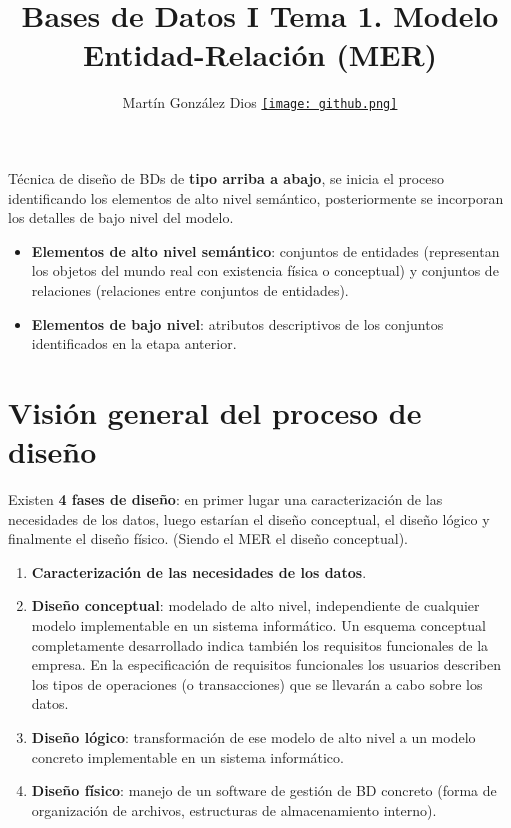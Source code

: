 \documentclass{article}
\title{Bases de Datos I Tema 1. Modelo Entidad-Relación (MER)}
\author{Martín González Dios 
\href{https://github.com/martindios}{\texttt{[image: github.png]}}}
\begin{document}
\maketitle

Técnica de diseño de BDs de \textbf{tipo arriba a abajo}, se inicia el proceso identificando los elementos de alto nivel semántico, posteriormente se incorporan los detalles de bajo nivel del modelo. \\
\begin{itemize}
    \item \textbf{Elementos de alto nivel semántico}: conjuntos de entidades (representan los objetos del mundo real con existencia física o conceptual) y conjuntos de relaciones (relaciones entre conjuntos de entidades).

    \item \textbf{Elementos de bajo nivel}: atributos descriptivos de los conjuntos identificados en la etapa anterior.
\end{itemize}

\section{Visión general del proceso de diseño}
Existen \textbf{4 fases de diseño}: en primer lugar una caracterización de las necesidades de los datos, luego estarían el diseño conceptual, el diseño lógico y finalmente el diseño físico. (Siendo el MER el diseño conceptual). \\

\begin{enumerate}
    \item \textbf{Caracterización de las necesidades de los datos}.

    \item \textbf{Diseño conceptual}: modelado de alto nivel, independiente de cualquier modelo implementable en un sistema informático. Un esquema conceptual completamente desarrollado indica también los requisitos funcionales de la empresa. En la especificación de requisitos funcionales los usuarios describen los tipos de operaciones (o transacciones) que se llevarán a cabo sobre los datos.

    \item \textbf{Diseño lógico}: transformación de ese modelo de alto nivel a un modelo concreto implementable en un sistema informático.

    \item \textbf{Diseño físico}: manejo de un software de gestión de BD concreto (forma de organización de archivos, estructuras de almacenamiento interno).
\end{enumerate}
\end{document}
